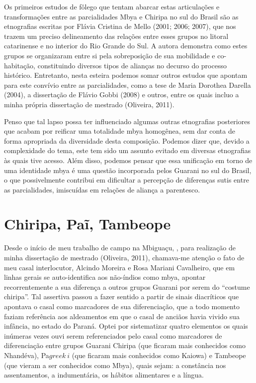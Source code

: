 Os primeiros estudos de fôlego que tentam abarcar estas articulações e
transformações entre as parcialidades Mbya e Chiripa no sul do Brasil
são as etnografias escritas por Flávia Cristina de Mello (2001; 2006;
2007), que nos trazem um preciso delineamento das relações entre esses
grupos no litoral catarinense e no interior do Rio Grande do Sul. A
autora demonstra como estes grupos se organizaram entre si pela
sobreposição de sua mobilidade e co-habitação, constituindo diversos
tipos de alianças no decurso do processo histórico. Entretanto, nesta
esteira podemos somar outros estudos que apontam para este convívio
entre as parcialidades, como a tese de Maria Dorothea Darella (2004), a
dissertação de Flávio Gobbi (2008) e outros, entre os quais incluo a
minha própria dissertação de mestrado (Oliveira, 2011). 

Penso que tal lapso possa ter influenciado algumas outras etnografias
posteriores que acabam por reificar uma totalidade mbya homogênea, sem
dar conta de forma apropriada da diversidade desta composição. Podemos
dizer que, devido a complexidade do tema, este tem sido um assunto
evitado em diversas etnografias às quais tive acesso. Além disso,
podemos pensar que essa unificação em torno de uma identidade mbya é
uma questão incorporada pelos Guarani no sul do Brasil, o que
possivelmente contribui em dificultar a percepção de diferenças sutis
entre as parcialidades, imiscuídas em relações de aliança a parentesco.

\section{Chiripa, Paĩ, Tambeope}

Desde o início de meu trabalho de campo na  Mbiguaçu, , para
realização de minha dissertação de mestrado (Oliveira, 2011),
chamava-me atenção o fato de meu casal interlocutor, Alcindo Moreira e
Rosa Mariani Cavalheiro, que em linhas gerais se auto-identifica aos
não-índios como mbya, apontar recorrentemente a sua diferença a outros
grupos Guarani por serem do ``costume chiripa''. Tal assertiva passou a
fazer sentido a partir de sinais diacríticos que apontava o casal como
marcadores de sua diferenciação, que a todo momento faziam referência
aos aldeamentos em que o casal de anciãos havia vivido sua infância, no
estado do Paraná. Optei por sistematizar quatro elementos os quais
inúmeras vezes ouvi serem referenciados pelo casal como marcadores de
diferenciação entre grupos Guarani Chiripa (que ficaram mais conhecidos
como Nhandéva), Pa${greek{~i}}$ (que ficaram mais conhecidos
como Kaiowa) e Tambeope (que vieram a ser conhecidos como Mbya), quais
sejam: a constância nos assentamentos, a indumentária, os hábitos
alimentares e a língua. 

